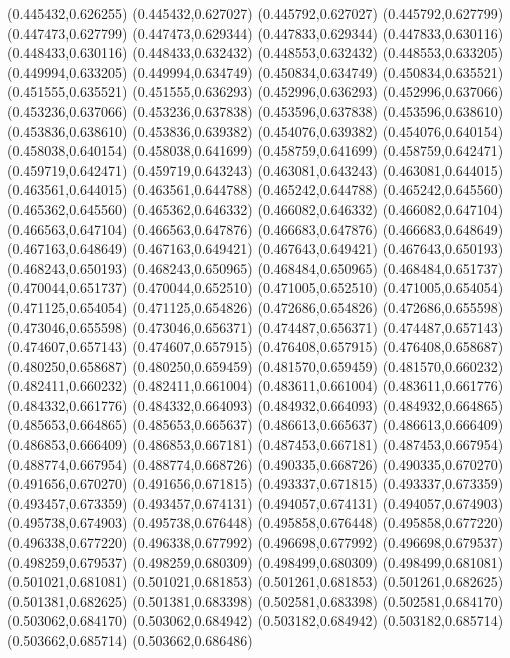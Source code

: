 (0.445432,0.626255)
(0.445432,0.627027)
(0.445792,0.627027)
(0.445792,0.627799)
(0.447473,0.627799)
(0.447473,0.629344)
(0.447833,0.629344)
(0.447833,0.630116)
(0.448433,0.630116)
(0.448433,0.632432)
(0.448553,0.632432)
(0.448553,0.633205)
(0.449994,0.633205)
(0.449994,0.634749)
(0.450834,0.634749)
(0.450834,0.635521)
(0.451555,0.635521)
(0.451555,0.636293)
(0.452996,0.636293)
(0.452996,0.637066)
(0.453236,0.637066)
(0.453236,0.637838)
(0.453596,0.637838)
(0.453596,0.638610)
(0.453836,0.638610)
(0.453836,0.639382)
(0.454076,0.639382)
(0.454076,0.640154)
(0.458038,0.640154)
(0.458038,0.641699)
(0.458759,0.641699)
(0.458759,0.642471)
(0.459719,0.642471)
(0.459719,0.643243)
(0.463081,0.643243)
(0.463081,0.644015)
(0.463561,0.644015)
(0.463561,0.644788)
(0.465242,0.644788)
(0.465242,0.645560)
(0.465362,0.645560)
(0.465362,0.646332)
(0.466082,0.646332)
(0.466082,0.647104)
(0.466563,0.647104)
(0.466563,0.647876)
(0.466683,0.647876)
(0.466683,0.648649)
(0.467163,0.648649)
(0.467163,0.649421)
(0.467643,0.649421)
(0.467643,0.650193)
(0.468243,0.650193)
(0.468243,0.650965)
(0.468484,0.650965)
(0.468484,0.651737)
(0.470044,0.651737)
(0.470044,0.652510)
(0.471005,0.652510)
(0.471005,0.654054)
(0.471125,0.654054)
(0.471125,0.654826)
(0.472686,0.654826)
(0.472686,0.655598)
(0.473046,0.655598)
(0.473046,0.656371)
(0.474487,0.656371)
(0.474487,0.657143)
(0.474607,0.657143)
(0.474607,0.657915)
(0.476408,0.657915)
(0.476408,0.658687)
(0.480250,0.658687)
(0.480250,0.659459)
(0.481570,0.659459)
(0.481570,0.660232)
(0.482411,0.660232)
(0.482411,0.661004)
(0.483611,0.661004)
(0.483611,0.661776)
(0.484332,0.661776)
(0.484332,0.664093)
(0.484932,0.664093)
(0.484932,0.664865)
(0.485653,0.664865)
(0.485653,0.665637)
(0.486613,0.665637)
(0.486613,0.666409)
(0.486853,0.666409)
(0.486853,0.667181)
(0.487453,0.667181)
(0.487453,0.667954)
(0.488774,0.667954)
(0.488774,0.668726)
(0.490335,0.668726)
(0.490335,0.670270)
(0.491656,0.670270)
(0.491656,0.671815)
(0.493337,0.671815)
(0.493337,0.673359)
(0.493457,0.673359)
(0.493457,0.674131)
(0.494057,0.674131)
(0.494057,0.674903)
(0.495738,0.674903)
(0.495738,0.676448)
(0.495858,0.676448)
(0.495858,0.677220)
(0.496338,0.677220)
(0.496338,0.677992)
(0.496698,0.677992)
(0.496698,0.679537)
(0.498259,0.679537)
(0.498259,0.680309)
(0.498499,0.680309)
(0.498499,0.681081)
(0.501021,0.681081)
(0.501021,0.681853)
(0.501261,0.681853)
(0.501261,0.682625)
(0.501381,0.682625)
(0.501381,0.683398)
(0.502581,0.683398)
(0.502581,0.684170)
(0.503062,0.684170)
(0.503062,0.684942)
(0.503182,0.684942)
(0.503182,0.685714)
(0.503662,0.685714)
(0.503662,0.686486)
